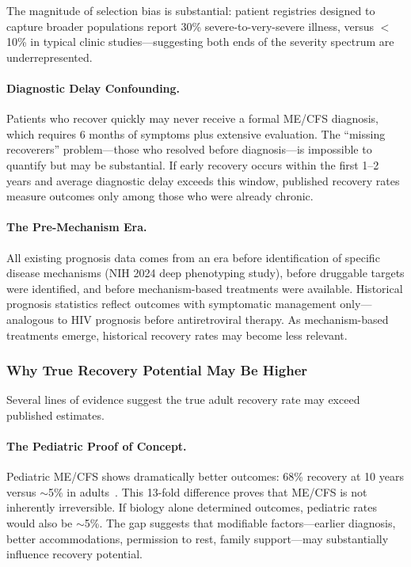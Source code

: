 The magnitude of selection bias is substantial: patient registries designed to capture broader populations report 30\% severe-to-very-severe illness, versus $<$10\% in typical clinic studies---suggesting both ends of the severity spectrum are underrepresented.

\paragraph{Diagnostic Delay Confounding.}
Patients who recover quickly may never receive a formal ME/CFS diagnosis, which requires 6 months of symptoms plus extensive evaluation. The ``missing recoverers'' problem---those who resolved before diagnosis---is impossible to quantify but may be substantial. If early recovery occurs within the first 1--2 years and average diagnostic delay exceeds this window, published recovery rates measure outcomes only among those who were already chronic.

\paragraph{The Pre-Mechanism Era.}
All existing prognosis data comes from an era before identification of specific disease mechanisms (NIH 2024 deep phenotyping study), before druggable targets were identified, and before mechanism-based treatments were available. Historical prognosis statistics reflect outcomes with symptomatic management only---analogous to HIV prognosis before antiretroviral therapy. As mechanism-based treatments emerge, historical recovery rates may become less relevant.

\subsubsection{Why True Recovery Potential May Be Higher}

Several lines of evidence suggest the true adult recovery rate may exceed published estimates.

\paragraph{The Pediatric Proof of Concept.}
Pediatric ME/CFS shows dramatically better outcomes: 68\% recovery at 10 years versus $\sim$5\% in adults~\cite{Rowe2019pediatric}. This 13-fold difference proves that ME/CFS is not inherently irreversible. If biology alone determined outcomes, pediatric rates would also be $\sim$5\%. The gap suggests that modifiable factors---earlier diagnosis, better accommodations, permission to rest, family support---may substantially influence recovery potential.

